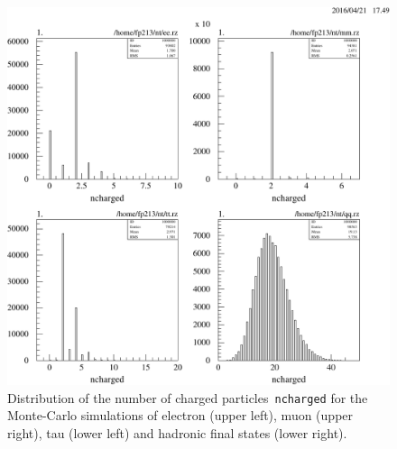 \documentclass[11pt, a4paper]{article}
\numberwithin{equation}{section}
\begin{document}
\begin{appendix}
\begin{figure}[h]
	\centering
	\includegraphics[width=1\textwidth]{./data/tag2/uncut/cropped/ncharged_uncut.pdf}
	\caption{Distribution of the number of charged particles~\texttt{ncharged} for the Monte-Carlo simulations of electron (upper left), muon (upper right), tau (lower left) and hadronic final states (lower right).}
\end{figure}


\end{appendix}
\end{document}

